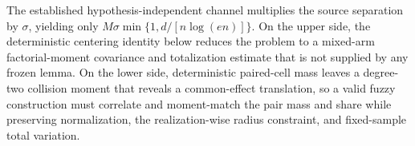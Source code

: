 The established hypothesis-independent channel multiplies the source separation by \(\sigma\), yielding only \(M\sigma\min\{1,d/[n\log(en)]\}\).  On the upper side, the deterministic centering identity below reduces the problem to a mixed-arm factorial-moment covariance and totalization estimate that is not supplied by any frozen lemma.  On the lower side, deterministic paired-cell mass leaves a degree-two collision moment that reveals a common-effect translation, so a valid fuzzy construction must correlate and moment-match the pair mass and share while preserving normalization, the realization-wise radius constraint, and fixed-sample total variation.